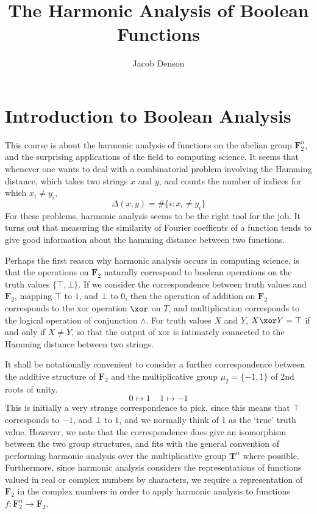 

\title{The Harmonic Analysis of Boolean Functions}
\author{Jacob Denson}




\maketitle

\tableofcontents


\chapter{Introduction to Boolean Analysis}

This course is about the harmonic analysis of functions on the abelian group $\mathbf{F}_2^n$, and the surprising applications of the field to computing science. It seems that whenever one wants to deal with a combinatorial problem involving the Hamming distance, which takes two strings $x$ and $y$, and counts the number of indices for which $x_i \neq y_i$,
%
\[ \Delta(x,y) = \# \{ i : x_i \neq y_i \} \]
%
For these problems, harmonic analysis seems to be the right tool for the job. It turns out that measuring the similarity of Fourier coeffients of a function tends to give good information about the hamming distance between two functions.

Perhaps the first reason why harmonic analysis occurs in computing science, is that the operations on $\mathbf{F}_2$ naturally correspond to boolean operations on the truth values $\{ \top, \bot \}$. If we consider the correspondence between truth values and $\mathbf{F}_2$, mapping $\top$ to $1$, and $\bot$ to $0$, then the operation of addition on $\mathbf{F}_2$ corresponds to the xor operation $\xor$ on $T$, and multiplication corresponds to the logical operation of conjunction $\wedge$. For truth values $X$ and $Y$, $X \xor Y = \top$ if and only if $X \neq Y$, so that the output of xor is intimately connected to the Hamming distance between two strings.

It shall be notationally convenient to consider a further correspondence between the additive structure of $\mathbf{F}_2$ and the multiplicative group $\mu_2 = \{ -1, 1 \}$ of 2nd roots of unity.
%
\[ 0 \mapsto 1\ \ \ \ \ 1 \mapsto -1 \]
%
This is initially a very strange correspondence to pick, since this means that $\top$ corresponds to $-1$, and $\bot$ to $1$, and we normally think of $1$ as the `true' truth value. However, we note that the correspondence does give an isomorphism between the two group structures, and fits with the general convention of performing harmonic analysis over the multiplicative group $\mathbf{T}^n$ where possible. Furthermore, since harmonic analysis considers the representations of functions valued in real or complex numbers by characters, we require a representation of $\mathbf{F}_2$ in the complex numbers in order to apply harmonic analysis to functions $f: \mathbf{F}_2^n \to \mathbf{F}_2$.

